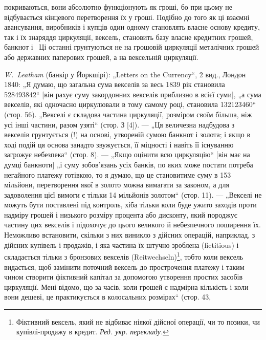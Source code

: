 \parcont{}  %
покриваються, вони абсолютно функціонують як гроші, бо при
цьому не відбувається кінцевого перетворення їх у гроші. Подібно
до того як ці взаємні авансування, виробників і купців
один одному становлять власне основу кредиту, так і їх знаряддя
циркуляції, вексель, становить базу власне кредитних
грошей, банкнот і~ Ці останні грунтуються не на грошовій
циркуляції металічних грошей або державних паперових грошей,
а на вексельній циркуляції.

\begin{small}
\noindent{}\emph{W.~Leatham} (банкір у Йоркшірі): „Letters on the Currency“, 2 вид., Лондон 1840:
„Я думаю, що загальна сума векселів за весь 1839 рік становила \num{528493842}“ [він рахує суму закордонних векселів приблизно в  всієї суми],
„а сума векселів, які одночасно циркулювали в тому самому році, становила
\num{132123460}“ (стор. 56). „Векселі є складова частина циркуляції,
розміром своїм більша, ніж усі інші частини, разом узяті“ (стор. З [4]). — „Ця
величезна надбудова з векселів грунтується (!) на основі, утвореній сумою
банкнот і золота; і якщо в ході подій ця основа занадто звужується, її міцності
і навіть її існуванню загрожує небезпека“ (стор. 8). — „Якщо оцінити всю
циркуляцію“ [він має на думці банкноти] „і суму зобов’язань усіх банків,
по яких може постати потреба негайного платежу готівкою, то я думаю, що
це становитиме суму в 153 мільйони, перетворення якої в золото можна вимагати
за законом, а для задоволення цієї вимоги є тільки 14 мільйонів золотом“
(стор. 11). — „Векселі не можуть бути поставлені під контроль, хіба тільки
коли буде ужито заходів проти надміру грошей і низького розміру процента
або дисконту, який породжує частину цих векселів і підохочує до цього великого
й небезпечного поширення їх. Неможливо встановити, скільки з них виникло
з дійсних операцій, наприклад, з дійсних купівель і продажів, і яка частина їх
штучно зроблена (fictitious) і складається тільки з бронзових векселів (Reitwechseln)\footnote*{
Фіктивний вексель, який не відбиває ніякої дійсної операції, чи то позики,
чи купівлі-продажу в кредит. \emph{Ред. укр. перекладу.}
}, тобто коли
вексель видається, щоб замінити поточний вексель до прострочення платежу і таким чином створити
фіктивний капітал за допомогою утворення простих засобів циркуляції. Мені відомо, що за часів, коли
грошей є надмірна кількість і коли вони дешеві, це практикується в колосальних розмірах“ (стор. 43,

\end{small}
